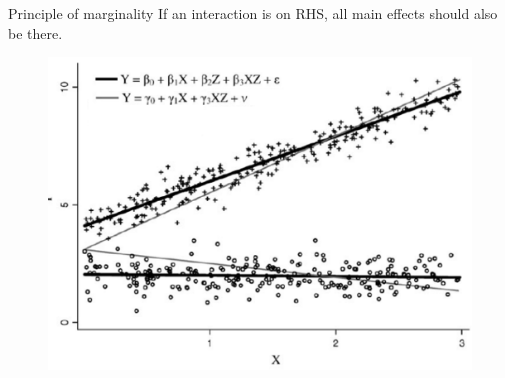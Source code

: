 \documentclass{beamer}
\begin{document}
\begin{frame}{Principle of marginality}
If an interaction is on RHS, all main effects should also be there.
\begin{figure}
\centering
\includegraphics[width=0.68\linewidth]{./Figures/principleofmarginality}
\label{fig:principleofmarginality}
\end{figure}

\end{frame}
\end{document}

